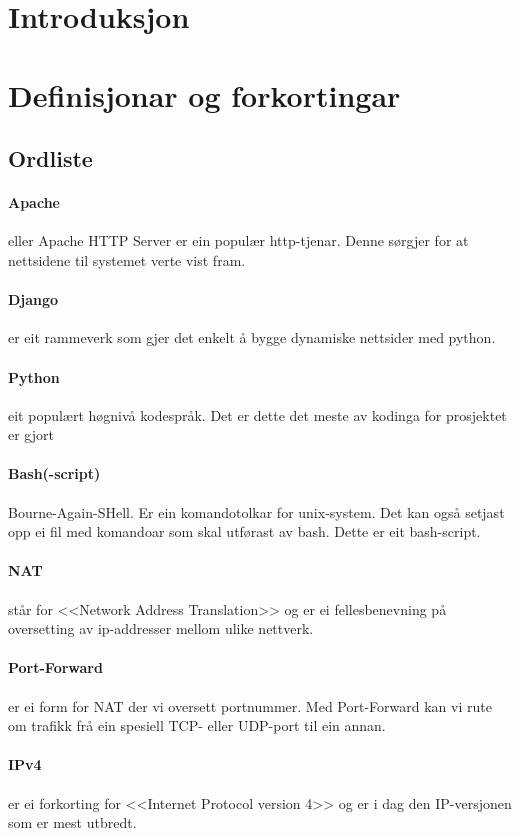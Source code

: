 \documentclass[nynorsk,12pt,a4paper,oneside]{book}
\begin{document}
\section{Introduksjon}

\section{Definisjonar og forkortingar}
\subsection{Ordliste}
\paragraph{Apache} eller Apache HTTP Server er ein populær http-tjenar. Denne sørgjer for at nettsidene til systemet verte vist fram.
\paragraph{Django} er eit rammeverk som gjer det enkelt å bygge dynamiske nettsider med python.
\paragraph{Python} eit populært høgnivå kodespråk. Det er dette det meste av kodinga for prosjektet er gjort
\paragraph{Bash(-script)} Bourne-Again-SHell. Er ein komandotolkar for unix-system. Det kan også setjast opp ei fil med komandoar som skal utførast av bash. Dette er eit bash-script.
\paragraph{NAT} står for <<Network Address Translation>> og er ei fellesbenevning på oversetting av ip-addresser mellom ulike nettverk. 
\paragraph{Port-Forward} er ei form for NAT der vi oversett portnummer. Med Port-Forward kan vi rute om trafikk frå ein spesiell TCP- eller UDP-port til ein annan.
\paragraph{IPv4} er ei forkorting for <<Internet Protocol version 4>> og er i dag den IP-versjonen som er mest utbredt. 
\end{document}
